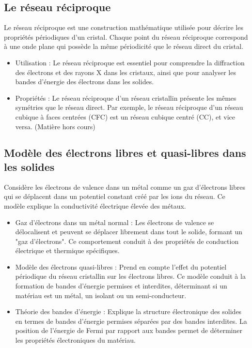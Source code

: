 \documentclass{article}
\begin{document}
    \subsection{Le réseau réciproque}
    Le réseau réciproque est une construction mathématique utilisée pour décrire les propriétés périodiques d'un cristal. Chaque point du réseau réciproque correspond à une onde plane qui possède la même périodicité que le réseau direct du cristal.
    \begin{itemize}
        \item Utilisation : Le réseau réciproque est essentiel pour comprendre la diffraction des électrons et des rayons X dans les cristaux, ainsi que pour analyser les bandes d'énergie des électrons dans les solides.
        \item Propriétés : Le réseau réciproque d'un réseau cristallin présente les mêmes symétries que le réseau direct. Par exemple, le réseau réciproque d'un réseau cubique à faces centrées (CFC) est un réseau cubique centré (CC), et vice versa. (Matière hors cours)
    \end{itemize}

    \subsection{Modèle des électrons libres et quasi-libres dans les solides}
    Considère les électrons de valence dans un métal comme un gaz d'électrons libres qui se déplacent dans un potentiel constant créé par les ions du réseau. Ce modèle explique la conductivité électrique élevée des métaux.

    \begin{itemize}
        \item Gaz d'électrons dans un métal normal : Les électrons de valence se délocalisent et peuvent se déplacer librement dans tout le solide, formant un "gaz d'électrons". Ce comportement conduit à des propriétés de conduction électrique et thermique spécifiques.
        \item Modèle des électrons quasi-libres : Prend en compte l'effet du potentiel périodique du réseau cristallin sur les électrons libres. Ce modèle conduit à la formation de bandes d'énergie permises et interdites, déterminant si un matériau est un métal, un isolant ou un semi-conducteur.
        \item Théorie des bandes d'énergie : Explique la structure électronique des solides en termes de bandes d'énergie permises séparées par des bandes interdites. La position de l'énergie de Fermi par rapport aux bandes permet de déterminer les propriétés électroniques du matériau.
    \end{itemize}
\end{document}
